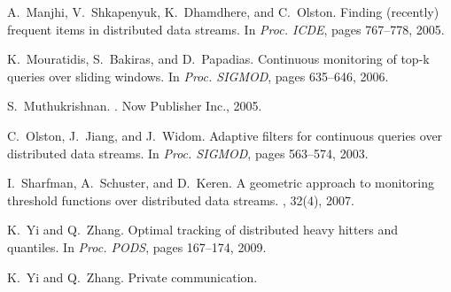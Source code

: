 \documentclass[proceedings]{stacs}
\theoremstyle{definition}\newtheorem{fact}{Fact}
\begin{document}
\begin{thebibliography}{10}
A.~Manjhi, V.~Shkapenyuk, K.~Dhamdhere, and C.~Olston.
\newblock Finding (recently) frequent items in distributed data streams.
\newblock In {\em Proc. ICDE}, pages 767--778, 2005.

K.~Mouratidis, S.~Bakiras, and D.~Papadias.
\newblock Continuous monitoring of top-k queries over sliding windows.
\newblock In {\em Proc. SIGMOD}, pages 635--646, 2006.

S.~Muthukrishnan.
.
\newblock Now Publisher Inc., 2005.

C.~Olston, J.~Jiang, and J.~Widom.
\newblock Adaptive filters for continuous queries over distributed data
  streams.
\newblock In {\em Proc. SIGMOD}, pages 563--574, 2003.

I.~Sharfman, A.~Schuster, and D.~Keren.
\newblock A geometric approach to monitoring threshold functions over
  distributed data streams.
, 32(4), 2007.

K.~Yi and Q.~Zhang.
\newblock Optimal tracking of distributed heavy hitters and quantiles.
\newblock In {\em Proc. PODS}, pages 167--174, 2009.

K.~Yi and Q.~Zhang.
\newblock Private communication.
\end{thebibliography}
\end{document}
